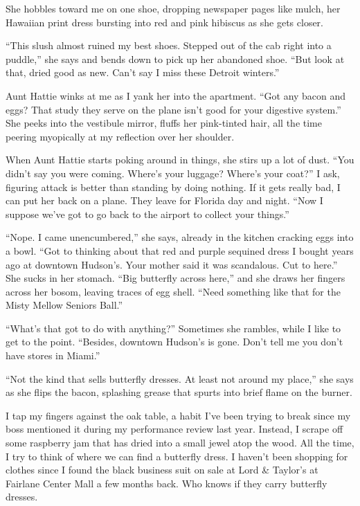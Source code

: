 \documentclass[
]{article}
\begin{document}
She hobbles toward me on one shoe, dropping newspaper pages like mulch,
her Hawaiian print dress bursting into red and pink hibiscus as she gets
closer.

``This slush almost ruined my best shoes. Stepped out of the cab right
into a puddle,'' she says and bends down to pick up her abandoned shoe.
``But look at that, dried good as new. Can't say I miss these Detroit
winters.''

Aunt Hattie winks at me as I yank her into the apartment. ``Got any
bacon and eggs? That study they serve on the plane isn't good for your
digestive system.'' She peeks into the vestibule mirror, fluffs her
pink-tinted hair, all the time peering myopically at my reflection over
her shoulder.

When Aunt Hattie starts poking around in things, she stirs up a lot of
dust. ``You didn't say you were coming. Where's your luggage? Where's
your coat?'' I ask, figuring attack is better than standing by doing
nothing. If it gets really bad, I can put her back on a plane. They
leave for Florida day and night. ``Now I suppose we've got to go back to
the airport to collect your things.''

``Nope. I came unencumbered,'' she says, already in the kitchen cracking
eggs into a bowl. ``Got to thinking about that red and purple sequined
dress I bought years ago at downtown Hudson's. Your mother said it was
scandalous. Cut to here.'' She sucks in her stomach. ``Big butterfly
across here,'' and she draws her fingers across her bosom, leaving
traces of egg shell. ``Need something like that for the Misty Mellow
Seniors Ball.''

``What's that got to do with anything?'' Sometimes she rambles, while I
like to get to the point. ``Besides, downtown Hudson's is gone. Don't
tell me you don't have stores in Miami.''

``Not the kind that sells butterfly dresses. At least not around my
place,'' she says as she flips the bacon, splashing grease that spurts
into brief flame on the burner.

I tap my fingers against the oak table, a habit I've been trying to
break since my boss men­tioned it during my performance review last
year. Instead, I scrape off some raspberry jam that has dried into a
small jewel atop the wood. All the time, I try to think of where we can
find a butterfly dress. I haven't been shopping for clothes since I
found the black business suit on sale at Lord \& Taylor's at Fairlane
Center Mall a few months back. Who knows if they carry butterfly
dresses.
\end{document}
